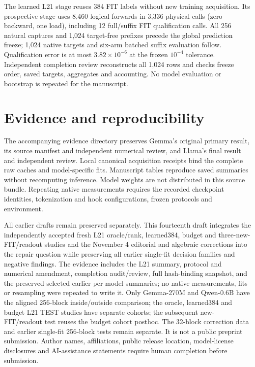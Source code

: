 The learned L21 stage reuses 384 FIT labels without new training acquisition. Its prospective stage uses 8,460 logical forwards in 3,336 physical calls (zero backward, one load), including 12 full/suffix FIT qualification calls. All 256 natural captures and 1,024 target-free prefixes precede the global prediction freeze; 1,024 native targets and six-arm batched suffix evaluation follow. Qualification error is at most $3.82\times10^{-6}$ at the frozen $10^{-4}$ tolerance. Independent completion review reconstructs all 1,024 rows and checks freeze order, saved targets, aggregates and accounting. No model evaluation or bootstrap is repeated for the manuscript.

\section{Evidence and reproducibility}
The accompanying evidence directory preserves Gemma's original primary result, its source manifest and independent numerical review, and Llama's final result and independent review. Local canonical acquisition receipts bind the complete raw caches and model-specific fits. Manuscript tables reproduce saved summaries without recomputing inference. Model weights are not distributed in this source bundle. Repeating native measurements requires the recorded checkpoint identities, tokenization and hook configurations, frozen protocols and environment.

All earlier drafts remain preserved separately. This fourteenth draft integrates the independently accepted fresh L21 oracle/rank, learned384, budget and three-new-FIT/readout studies and the November 4 editorial and algebraic corrections into the repair question while preserving all earlier single-fit decision families and negative findings. The evidence includes the L21 summary, protocol and numerical amendment, completion audit/review, full hash-binding snapshot, and the preserved selected earlier per-model summaries; no native measurements, fits or resampling were repeated to write it. Only Gemma-270M and Qwen-0.6B have the aligned 256-block inside/outside comparison; the oracle, learned384 and budget L21 TEST studies have separate cohorts; the subsequent new-FIT/readout test reuses the budget cohort posthoc. The 32-block correction data and earlier single-fit 256-block tests remain separate. It is not a public preprint submission. Author names, affiliations, public release location, model-license disclosures and AI-assistance statements require human completion before submission.
\clearpage
